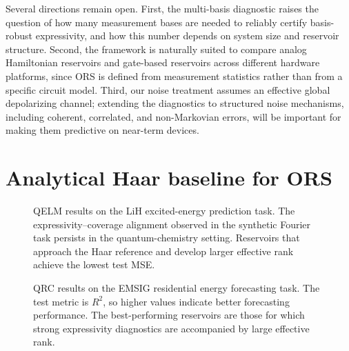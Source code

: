 \documentclass[
    aps,
    pre,
    amsmath,
    amssymb,
    reprint,
    superscriptaddress,
    preprintnumbers,
]{revtex4-2}
\begin{document}
Several directions remain open. First, the multi-basis diagnostic raises the question of how many measurement bases are needed to reliably certify basis-robust expressivity, and how this number depends on system size and reservoir structure. Second, the framework is naturally suited to compare analog Hamiltonian reservoirs and gate-based reservoirs across different hardware platforms, since ORS is defined from measurement statistics rather than from a specific circuit model. Third, our noise treatment assumes an effective global depolarizing channel; extending the diagnostics to structured noise mechanisms, including coherent, correlated, and non-Markovian errors, will be important for making them predictive on near-term devices.

%



\appendix

\section{Analytical Haar baseline for ORS}
\label{app:ors}

\begin{figure}[t]
\centering
\resizebox{0.9\textwidth}{!}{%
}
\caption{QELM results on the LiH excited-energy prediction task. The expressivity--coverage alignment observed in the synthetic Fourier task persists in the quantum-chemistry setting. Reservoirs that approach the Haar reference and develop larger effective rank achieve the lowest test MSE.}
\label{fig:lih-results}
\end{figure}

\begin{figure}[t]
\centering
\resizebox{0.9\textwidth}{!}{%
}
\caption{QRC results on the EMSIG residential energy forecasting task. The test metric is $R^2$, so higher values indicate better forecasting performance. The best-performing reservoirs are those for which strong expressivity diagnostics are accompanied by large effective rank.}
\label{fig:emsig-results}
\end{figure}
\end{document}
